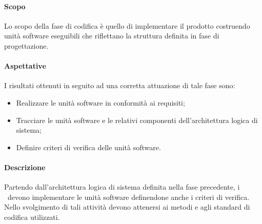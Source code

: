 \documentclass[../NormeDiProgetto.tex]{subfiles}
\begin{document}
			\paragraph{Scopo\\}
				Lo scopo della fase di codifica è quello di implementare il prodotto costruendo
				unità software eseguibili che riflettano la struttura definita in fase di
				progettazione.
			\paragraph{Aspettative\\}
				I risultati ottenuti in seguito ad una corretta attuazione di tale fase sono:
				\begin{itemize}
					\item Realizzare le unità software in conformità ai requisiti;
					\item Tracciare le unità software e le relativi componenti dell'architettura
					logica di sistema;
					\item Definire criteri di verifica delle unità software.
				\end{itemize}
			\paragraph{Descrizione\\}
				Partendo dall'architettura logica di sistema definita nella fase precedente, i
				\programmatori\ devono implementare le unità software definendone anche i criteri di
				verifica. Nello svolgimento di tali attività devono attenersi ai metodi e
				agli standard di codifica utilizzati.
\end{document}
